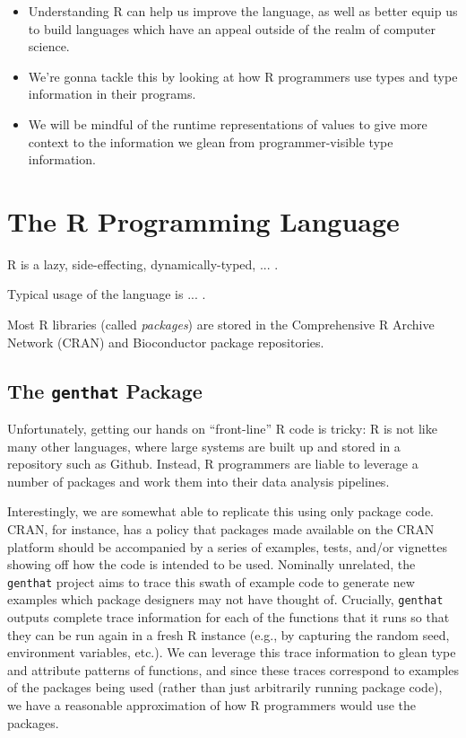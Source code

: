 \documentclass[acmsmall,10pt,review,anonymous]{acmart}\settopmatter{printfolios=true,printccs=false,printacmref=false}
\begin{document}
\begin{itemize}
    \item Understanding R can help us improve the language, as well as
      better equip us to build languages which have an appeal outside of the
      realm of computer science.
    \item We're gonna tackle this by looking at how R programmers use types
      and type information in their programs.
    \item We will be mindful of the runtime representations of values to
      give more context to the information we glean from programmer-visible
      type information.
\end{itemize}



%
\section{The R Programming Language}

R is a lazy, side-effecting, dynamically-typed, ... .

Typical usage of the language is ... .   

Most R libraries (called \textit{packages}) are stored in the Comprehensive
R Archive Network (CRAN) and Bioconductor package repositories.  



\subsection{The \texttt{genthat} Package}

Unfortunately, getting our hands on ``front-line'' R code is tricky: R is
not like many other languages, where large systems are built up and stored
in a repository such as Github.  Instead, R programmers are liable to
leverage a number of packages and work them into their data analysis
pipelines.

Interestingly, we are somewhat able to replicate this using only package
code.  CRAN, for instance, has a policy that packages made available on the
CRAN platform should be accompanied by a series of examples, tests, and/or
vignettes showing off how the code is intended to be used.  Nominally
unrelated, the {\tt genthat} project aims to trace this swath of example
code to generate new examples which package designers may not have thought
of.  Crucially, {\tt genthat} outputs complete trace information for each of
the functions that it runs so that they can be run again in a fresh R
instance (e.g., by capturing the random seed, environment variables, etc.).
We can leverage this trace information to glean type and attribute patterns
of functions, and since these traces correspond to examples of the packages
being used (rather than just arbitrarily running package code), we have a
reasonable approximation of how R programmers would use the packages.
\end{document}
